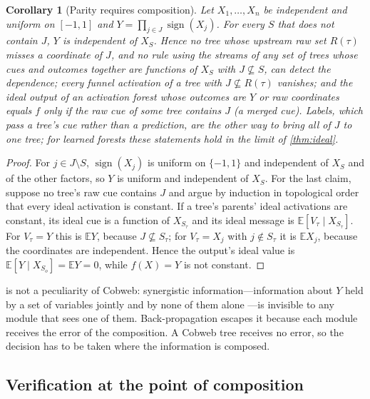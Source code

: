 \documentclass[11pt]{article}
\newtheorem{corollary}[theorem]{Corollary}
\theoremstyle{definition}
\theoremstyle{remark}
\newcommand{\E}{\mathbb{E}}
\begin{document}
\begin{corollary}[Parity requires composition]\label{cor:parity}
Let $X_1,\dots,X_n$ be independent and uniform on $[-1,1]$ and
$Y=\prod_{j\in J}\operatorname{sign}(X_j)$.  For every $S$ that does not contain $J$,
$Y$ is independent of $X_S$.  Hence no tree whose upstream raw set $R(\tau)$ misses a coordinate of $J$, and no rule
using the streams of any set of trees whose cues and outcomes together are functions of
$X_S$ with $J\not\subseteq S$, can detect the dependence; every funnel activation of a tree
with $J\not\subseteq R(\tau)$ vanishes; and the ideal output of an activation forest whose outcomes are $Y$ or raw
coordinates equals $f$ only if the raw cue of some tree contains $J$ (a merged cue).
Labels, which pass a tree's cue rather than a prediction, are the other way to bring all
of $J$ to one tree; for learned forests these statements hold in the limit of
\cref{thm:ideal}.
\end{corollary}
\begin{proof}
For $j\in J\setminus S$, $\operatorname{sign}(X_j)$ is uniform on $\{-1,1\}$ and
independent of $X_S$ and of the other factors, so $Y$ is uniform and independent of $X_S$.
For the last claim, suppose no tree's raw cue contains $J$ and argue by induction in
topological order that every ideal activation is constant.  If a tree's parents' ideal
activations are constant, its ideal cue is a function of $X_{S_\tau}$ and its ideal
message is $\E[V_\tau\mid X_{S_\tau}]$.  For $V_\tau=Y$ this is $\E Y$, because $J\not\subseteq
S_\tau$; for $V_\tau=X_j$ with $j\notin S_\tau$ it is $\E X_j$, because the coordinates are
independent.  Hence the output's ideal value is $\E[Y\mid X_{S_o}]=\E Y=0$, while
$f(X)=Y$ is not constant.
\end{proof}

 is not a peculiarity of Cobweb: synergistic information---information
about $Y$ held by a set of variables jointly and by none of them alone
\citep{williams2010}---is invisible to any module that sees one of them.  Back-propagation
escapes it because each module receives the error of the composition.  A Cobweb tree
receives no error, so the decision has to be taken where the information is composed.

\subsection{Verification at the point of composition}
\end{document}
